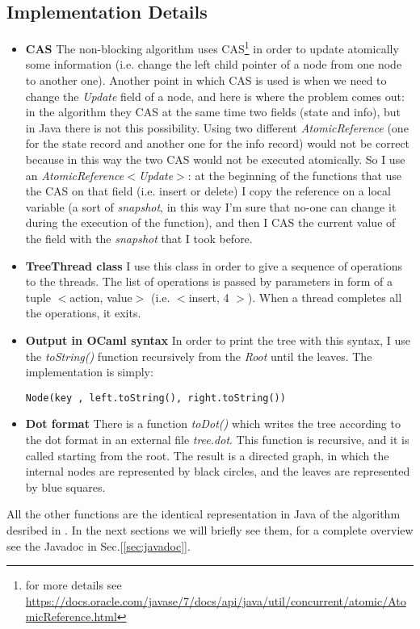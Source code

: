 \documentclass[a4paper]{article}
\begin{document}
\subsection{Implementation Details}
\label{subsec:implementation_details}
\begin{itemize}
  \item \textbf{\ac{CAS}} The non-blocking algorithm uses \ac{CAS}\footnote{for more details see \url{https://docs.oracle.com/javase/7/docs/api/java/util/concurrent/atomic/AtomicReference.html}} in order to update atomically some information (i.e. change the left child pointer of a node from one node to another one). Another point in which \ac{CAS} is used is when we need to change the \emph{Update} field of a node, and here is where the problem comes out: in the algorithm they \ac{CAS} at the same time two fields (state and info), but in Java there is not this possibility. Using two different \emph{AtomicReference} (one for the state record and another one for the info record) would not be correct because in this way the two \ac{CAS} would not be executed atomically. So I use an \emph{AtomicReference$<$Update$>$}: at the beginning of the functions that use the \ac{CAS} on that field (i.e. insert or delete) I copy the reference on a local variable (a sort of \emph{snapshot}, in this way I'm sure that no-one can change it during the execution of the function), and then I \ac{CAS} the current value of the field with the \emph{snapshot} that I took before.
  \item \textbf{TreeThread class} I use this class in order to give a sequence of operations to the threads. The list of operations is passed by parameters in form of a tuple $<$action, value$>$ (i.e. $<$insert, 4 $>$). When a thread completes all the operations, it exits.
  \item \textbf{Output in OCaml syntax} In order to print the tree with this syntax, I use the \emph{toString()} function recursively from the \emph{Root} until the leaves. The implementation is simply:

  \verb|Node(key , left.toString(), right.toString())|
  \item \textbf{Dot format} There is a function \emph{toDot()} which writes the tree according to the dot format in an external file \emph{tree.dot}. This function is recursive, and it is called starting from the root. The result is a directed graph, in which the internal nodes are represented by black circles, and the leaves are represented by blue squares.
\end{itemize}
\noindent
All the other functions are the identical representation in Java of the algorithm desribed in \cite{algorithm}. In the next sections we will briefly see them, for a complete overview see the Javadoc in Sec.[\ref{sec:javadoc}]. 
\end{document}
